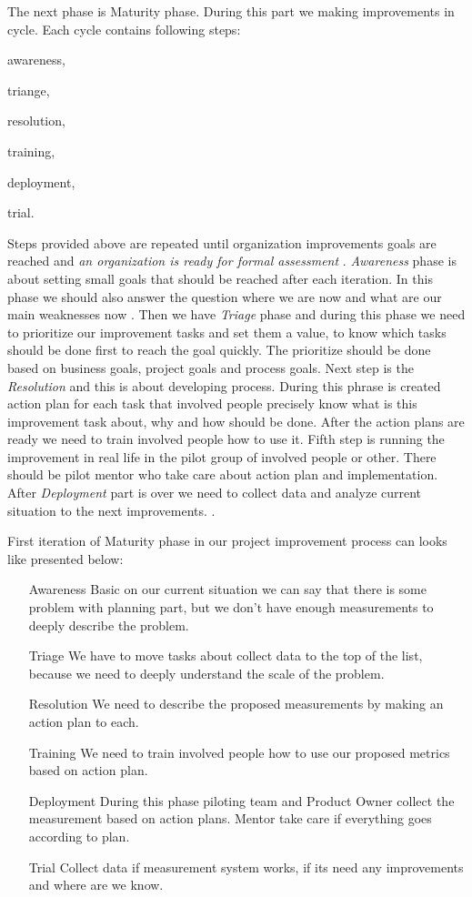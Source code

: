 The next phase is Maturity phase. During this part we making improvements in cycle. Each cycle contains following steps: 
\begin{inparaenum}
\item awareness,
\item triange,
\item resolution,
\item training,
\item deployment,
\item trial.
\end{inparaenum}
Steps provided above are repeated until organization improvements goals are reached and \textit{an organization is ready for formal assessment} \cite{jacobs_short}. \textit{Awareness} phase is about setting small goals that should be reached after each iteration. In this phase we should also answer the question where we are now and what are our main weaknesses now \cite{jacobs} \cite{jacobs_short}. Then we have \textit{Triage} phase and during this phase we need to prioritize our improvement tasks and set them a value, to know which tasks should be done first to reach the goal quickly. The prioritize should be done based on business goals, project goals and process goals. Next step is the \textit{Resolution} and this is about developing process. During this phrase is created action plan for each task that involved people precisely know what is this improvement task about, why and how should be done. After the action plans are ready we need to train involved people how to use it. Fifth step is running the improvement in real life in the pilot group of involved people or other. There should be pilot mentor who take care about action plan and implementation. After \textit{Deployment} part is over we need to collect data and analyze current situation to the next improvements. \cite{jacobs} \cite{jacobs_short}.

First iteration of Maturity phase in our project improvement process can looks like presented below:

\begin{enumerate}
\item[Awareness] Basic on our current situation we can say that there is some problem with planning part, but we don't have enough measurements to deeply describe the problem. 
\item[Triage] We have to move  tasks about collect data to the top of the list, because we need to deeply understand the scale of the problem.
\item[Resolution] We need to describe the proposed measurements by making an action plan to each.
\item[Training] We need to train involved people how to use our proposed metrics based on action plan.
\item[Deployment] During this phase piloting team and Product Owner collect the measurement based on action plans. Mentor take care if everything goes according to plan.
\item[Trial] Collect data if measurement system works, if its need any improvements and where are we know.
\end{enumerate}

